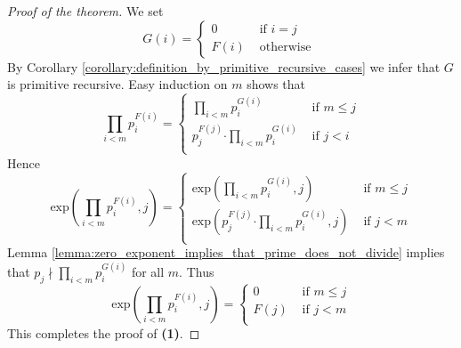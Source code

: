 \documentclass[10pt]{amsart}
\newcommand{\mle}{\boldsymbol{<}}
\newcommand{\mleq}{\boldsymbol{\leq}}
\newcommand{\meq}{\boldsymbol{=}}
\newcommand{\mdot}{\boldsymbol{\cdot}}
\begin{document}
\begin{proof}[Proof of the theorem]
	We set
	$$G(i) \meq \begin{cases}
			0    & \mbox{ if }i \meq j \\
			F(i) & \mbox{ otherwise }
		\end{cases}$$
	By Corollary \ref{corollary:definition_by_primitive_recursive_cases} we infer that $G$ is primitive recursive. Easy induction on $m$ shows that
	$$
		\prod_{i \mle m} p_i^{F(i)} =
		\begin{cases}
			\prod_{i \mle m} p_i^{G(i)}                  & \mbox{ if } m \mleq j \\[0.3em]
			p_j^{F(j)} \mdot \prod_{i \mle m} p_i^{G(i)} & \mbox{ if } j \mle i  \\
		\end{cases}
	$$
	Hence
	$$\mathrm{exp}\left(\prod_{i \mle m}p_i^{F(i)},j\right) \meq \begin{cases}
			\mathrm{exp}\left(\prod_{i \mle m}p_i^{G(i)}, j\right)                 & \mbox{ if }m \mleq j \\[0.3em]
			\mathrm{exp}\left(p_j^{F(j)}\mdot \prod_{i \mle m}p_i^{G(i)}, j\right) & \mbox{ if }j \mle m  \\
		\end{cases}
	$$
	Lemma \ref{lemma:zero_exponent_implies_that_prime_does_not_divide} implies that $p_j \nmid \prod_{i \mle m}p_i^{G(i)}$ for all $m$. Thus
	$$\mathrm{exp}\left(\prod_{i \mle m}p_i^{F(i)},j\right) \meq \begin{cases}
			0    & \mbox{ if }m \mleq j \\[0.3em]
			F(j) & \mbox{ if }j \mle m  \\
		\end{cases}
	$$
	This completes the proof of \textbf{(1)}.


\end{proof}
\end{document}

